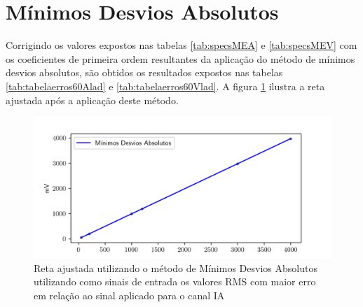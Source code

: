 \begin{table}[H]
\end{table}

\section{Mínimos Desvios Absolutos}

Corrigindo os valores expostos nas tabelas \ref{tab:specsMEA} e \ref{tab:specsMEV} com os coeficientes de primeira ordem resultantes da aplicação do método de mínimos desvios absolutos, são obtidos os resultados expostos nas tabelas \ref{tab:tabelaerros60Alad} e \ref{tab:tabelaerros60Vlad}. A figura \ref{fig:lad_line} ilustra a reta ajustada após a aplicação deste método.

\begin{figure}[H]
    \centering
    \includegraphics[width=12cm]{pictures/mda_linha.png}
    \caption{Reta ajustada utilizando o método de Mínimos Desvios Absolutos utilizando como sinais de entrada os valores RMS com maior erro em relação ao sinal aplicado para o canal IA}
    \label{fig:lad_line}
\end{figure}


